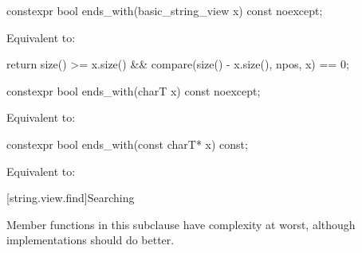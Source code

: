 %
\begin{itemdecl}
constexpr bool ends_with(basic_string_view x) const noexcept;
\end{itemdecl}

\begin{itemdescr}
\pnum
\effects
Equivalent to:
\begin{codeblock}
return size() >= x.size() && compare(size() - x.size(), npos, x) == 0;
\end{codeblock}
\end{itemdescr}

%
\begin{itemdecl}
constexpr bool ends_with(charT x) const noexcept;
\end{itemdecl}

\begin{itemdescr}
\pnum
\effects
Equivalent to: 
\end{itemdescr}

%
\begin{itemdecl}
constexpr bool ends_with(const charT* x) const;
\end{itemdecl}

\begin{itemdescr}
\pnum
\effects
Equivalent to: 
\end{itemdescr}

[string.view.find]{Searching}

\pnum
Member functions in this subclause have complexity  at worst,
although implementations should do better.

